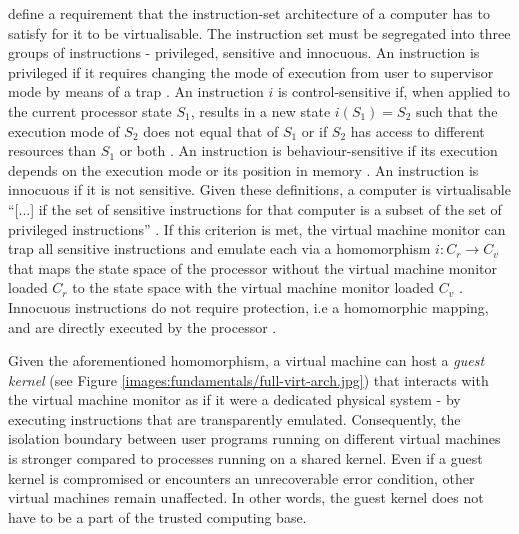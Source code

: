 \textcite{10.1145/361011.361073} define a requirement that the instruction-set architecture of a computer
has to satisfy for it to be virtualisable. The instruction set must be segregated into three groups of
instructions - privileged, sensitive and innocuous. An instruction is privileged if it requires changing
the mode of execution from user to supervisor mode by means of a trap \cite{10.1145/361011.361073}. 
An instruction $i$ is control-sensitive if, when applied to the current processor state $S_1$, results
in a new state $i(S_{1}) = S_{2}$ such that the execution mode of $S_{2}$ does not equal that of $S_{1}$
or if $S_{2}$ has access to different resources than $S_1$ or both \cite{10.1145/361011.361073}. 
An instruction is behaviour-sensitive if its execution depends on the execution mode or its position
in memory \cite{10.1145/361011.361073}. An instruction is innocuous if it is not sensitive. 
Given these definitions, a computer is virtualisable \enquote{[...] if the set of sensitive instructions
for that computer is a subset of the set of privileged instructions} \cite[6]{10.1145/361011.361073}.
If this criterion is met, the virtual machine monitor can trap all sensitive instructions and emulate 
each via a homomorphism $i: C_{r} \rightarrow C_{v}$ that maps the state space of the processor without
the virtual machine monitor loaded $C_{r}$ to the state space with the virtual machine monitor loaded 
$C_{v}$ \cite{10.1145/361011.361073}. Innocuous instructions do not require protection, i.e a homomorphic
mapping, and are directly executed by the processor \cite{10.1145/361011.361073}.

Given the aforementioned homomorphism, a virtual machine can host a \textit{guest kernel} 
(see Figure \ref{images:fundamentals/full-virt-arch.jpg}) that interacts with the virtual machine monitor
as if it were a dedicated physical system - by executing instructions that are transparently emulated.
Consequently, the isolation boundary between user programs running on different virtual 
machines is stronger compared to processes running on a shared kernel. Even if a guest kernel 
is compromised or encounters an unrecoverable error condition, other virtual machines remain 
unaffected. In other words, the guest kernel does not have to be a part of the trusted computing 
base.

